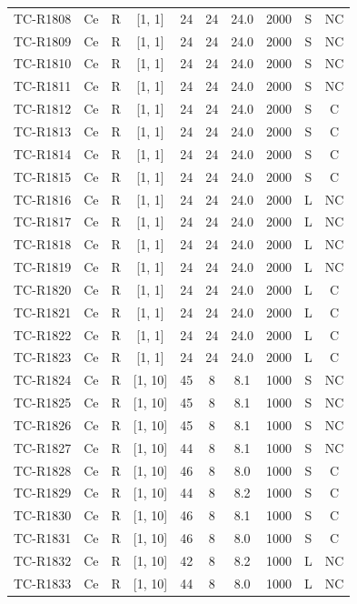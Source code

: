 \begin{longtable}{lccccccccc}
TC-R1808 & Ce & R & [1, 1] & 24 & 24 & 24.0 & 2000 & S & NC \\
TC-R1809 & Ce & R & [1, 1] & 24 & 24 & 24.0 & 2000 & S & NC \\
TC-R1810 & Ce & R & [1, 1] & 24 & 24 & 24.0 & 2000 & S & NC \\
TC-R1811 & Ce & R & [1, 1] & 24 & 24 & 24.0 & 2000 & S & NC \\
TC-R1812 & Ce & R & [1, 1] & 24 & 24 & 24.0 & 2000 & S & C \\
TC-R1813 & Ce & R & [1, 1] & 24 & 24 & 24.0 & 2000 & S & C \\
TC-R1814 & Ce & R & [1, 1] & 24 & 24 & 24.0 & 2000 & S & C \\
TC-R1815 & Ce & R & [1, 1] & 24 & 24 & 24.0 & 2000 & S & C \\
TC-R1816 & Ce & R & [1, 1] & 24 & 24 & 24.0 & 2000 & L & NC \\
TC-R1817 & Ce & R & [1, 1] & 24 & 24 & 24.0 & 2000 & L & NC \\
TC-R1818 & Ce & R & [1, 1] & 24 & 24 & 24.0 & 2000 & L & NC \\
TC-R1819 & Ce & R & [1, 1] & 24 & 24 & 24.0 & 2000 & L & NC \\
TC-R1820 & Ce & R & [1, 1] & 24 & 24 & 24.0 & 2000 & L & C \\
TC-R1821 & Ce & R & [1, 1] & 24 & 24 & 24.0 & 2000 & L & C \\
TC-R1822 & Ce & R & [1, 1] & 24 & 24 & 24.0 & 2000 & L & C \\
TC-R1823 & Ce & R & [1, 1] & 24 & 24 & 24.0 & 2000 & L & C \\
TC-R1824 & Ce & R & [1, 10] & 45 & 8 & 8.1 & 1000 & S & NC \\
TC-R1825 & Ce & R & [1, 10] & 45 & 8 & 8.1 & 1000 & S & NC \\
TC-R1826 & Ce & R & [1, 10] & 45 & 8 & 8.1 & 1000 & S & NC \\
TC-R1827 & Ce & R & [1, 10] & 44 & 8 & 8.1 & 1000 & S & NC \\
TC-R1828 & Ce & R & [1, 10] & 46 & 8 & 8.0 & 1000 & S & C \\
TC-R1829 & Ce & R & [1, 10] & 44 & 8 & 8.2 & 1000 & S & C \\
TC-R1830 & Ce & R & [1, 10] & 46 & 8 & 8.1 & 1000 & S & C \\
TC-R1831 & Ce & R & [1, 10] & 46 & 8 & 8.0 & 1000 & S & C \\
TC-R1832 & Ce & R & [1, 10] & 42 & 8 & 8.2 & 1000 & L & NC \\
TC-R1833 & Ce & R & [1, 10] & 44 & 8 & 8.0 & 1000 & L & NC \\

\end{longtable}
